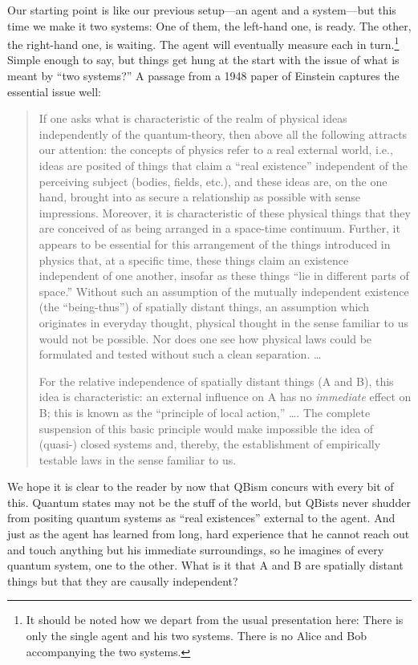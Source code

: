 \documentclass[aps,pra,superscriptaddress,12pt,tightenlines,nofootinbib]{revtex4-2}
\begin{document}
Our starting point is like our previous setup---an agent and a system---but this time we make it two systems:  One of them, the left-hand one, is ready. The other, the right-hand one, is waiting.  The agent will eventually measure each in turn.\footnote{It should be noted how we depart from the usual presentation here:  There is only the single agent and his two systems.  There is no Alice and Bob accompanying the two systems.}  Simple enough to say, but things get hung at the start with the issue of what is meant by ``two systems?''  A passage from a 1948 paper of Einstein \cite{Einstein48} captures the essential issue well:
\begin{quote}
\noindent If one asks what is characteristic of the realm of physical ideas independently of the quantum-theory, then above all the following attracts our attention: the concepts of physics refer to a real external world, i.e., ideas are posited of things that claim a ``real existence'' independent of the perceiving subject (bodies, fields, etc.), and these ideas are, on the one hand, brought into as secure a relationship as possible with sense impressions. Moreover, it is characteristic of these physical things that they are conceived of as being arranged in a space-time continuum. Further, it appears to be essential for this arrangement of the things introduced in physics that, at a specific time, these things claim an existence independent of one another, insofar as these things ``lie in different parts of space.'' Without such an assumption of the mutually independent existence (the ``being-thus'') of spatially distant things, an assumption which originates in everyday thought, physical thought in the sense familiar
to us would not be possible. Nor does one see how physical laws could be formulated and tested without such a clean separation. \ldots %

For the relative independence of spatially distant things (A and B), this idea is characteristic: an external influence on A has no {\it immediate\/} effect on B; this is known as the ``principle of local action,'' \ldots. %
The complete suspension of this basic principle would make impossible the idea of (quasi-) closed systems and, thereby, the establishment of empirically testable laws in the sense familiar to us.
\end{quote}
We hope it is clear to the reader by now that QBism concurs with every bit of this.  Quantum states may not be the stuff of the world, but QBists never shudder from positing quantum systems as ``real existences'' external to the agent.  And just as the agent has learned from long, hard experience that he cannot reach out and touch anything but his immediate surroundings, so he imagines of every quantum system, one to the other.  What is it that A and B are spatially distant things but that they are causally independent?
\end{document}
